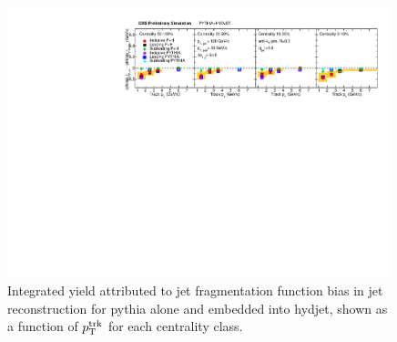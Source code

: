                   \begin{figure}[h!]
                  \begin{center}\includegraphics[width=0.99\textwidth]{figures/JFF_SpillOver/Integral_JFFResidual_pT.pdf}
                  \caption[Integrated yield attributed to jet fragmentation function bias as a function of $p_{\rm T}^{\rm trk}$]{Integrated yield attributed to jet fragmentation function bias in jet reconstruction for {\sc pythia} alone and embedded into {\sc hydjet}, shown as a function of $p_{\rm T}^{\rm trk}$ for each centrality class.}
                    \label{fig:jff_residual_integrals_pT}
                    \end{center}
                    \end{figure}

